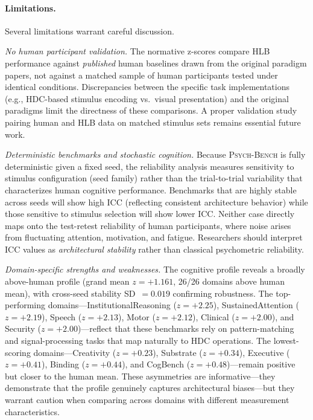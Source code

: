\documentclass[11pt,letterpaper]{article}
\newcommand{\psychbench}{\textsc{Psych-Bench}}
\newcommand{\hlb}{\textsc{HLB}}
\begin{document}
\paragraph{Limitations.} Several limitations warrant careful discussion.

\emph{No human participant validation.} The normative z-scores compare \hlb{} performance against \emph{published} human baselines drawn from the original paradigm papers, not against a matched sample of human participants tested under identical conditions. Discrepancies between the specific task implementations (e.g., HDC-based stimulus encoding vs.\ visual presentation) and the original paradigms limit the directness of these comparisons. A proper validation study pairing human and \hlb{} data on matched stimulus sets remains essential future work.

\emph{Deterministic benchmarks and stochastic cognition.} Because \psychbench{} is fully deterministic given a fixed seed, the reliability analysis measures sensitivity to stimulus configuration (seed family) rather than the trial-to-trial variability that characterizes human cognitive performance. Benchmarks that are highly stable across seeds will show high ICC (reflecting consistent architecture behavior) while those sensitive to stimulus selection will show lower ICC. Neither case directly maps onto the test-retest reliability of human participants, where noise arises from fluctuating attention, motivation, and fatigue. Researchers should interpret ICC values as \emph{architectural stability} rather than classical psychometric reliability.

\emph{Domain-specific strengths and weaknesses.} The cognitive profile reveals a broadly above-human profile (grand mean $z = +1.161$, 26/26 domains above human mean), with cross-seed stability SD~$= 0.019$ confirming robustness. The top-performing domains---InstitutionalReasoning ($z = +2.25$), SustainedAttention ($z = +2.19$), Speech ($z = +2.13$), Motor ($z = +2.12$), Clinical ($z = +2.00$), and Security ($z = +2.00$)---reflect that these benchmarks rely on pattern-matching and signal-processing tasks that map naturally to HDC operations. The lowest-scoring domains---Creativity ($z = +0.23$), Substrate ($z = +0.34$), Executive ($z = +0.41$), Binding ($z = +0.44$), and CogBench ($z = +0.48$)---remain positive but closer to the human mean. These asymmetries are informative---they demonstrate that the profile genuinely captures architectural biases---but they warrant caution when comparing across domains with different measurement characteristics.
\end{document}
